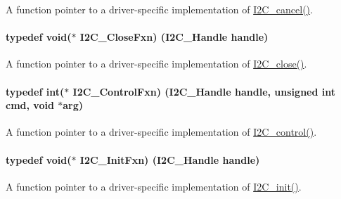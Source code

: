 A function pointer to a driver-\/specific implementation of \hyperlink{_i2_c_8h_a8cad0c04a9eca0fffc0ffe5586a5179b}{I2\+C\+\_\+cancel()}. 

\paragraph[{I2\+C\+\_\+\+Close\+Fxn}]{\setlength{\rightskip}{0pt plus 5cm}typedef void($\ast$ I2\+C\+\_\+\+Close\+Fxn) ({\bf I2\+C\+\_\+\+Handle} handle)}\label{_i2_c_8h_a083200108e980a0ef61e458f0b9fb9e7}


A function pointer to a driver-\/specific implementation of \hyperlink{_i2_c_8h_a12c86d89a687f2ee1eb980d99c32326d}{I2\+C\+\_\+close()}. 

\paragraph[{I2\+C\+\_\+\+Control\+Fxn}]{\setlength{\rightskip}{0pt plus 5cm}typedef int($\ast$ I2\+C\+\_\+\+Control\+Fxn) ({\bf I2\+C\+\_\+\+Handle} handle, unsigned int cmd, void $\ast$arg)}\label{_i2_c_8h_a4b15853f98d3d5e5135b8c52b8465fff}


A function pointer to a driver-\/specific implementation of \hyperlink{_i2_c_8h_a633003582213a5098467a4e647cc52f9}{I2\+C\+\_\+control()}. 

\paragraph[{I2\+C\+\_\+\+Init\+Fxn}]{\setlength{\rightskip}{0pt plus 5cm}typedef void($\ast$ I2\+C\+\_\+\+Init\+Fxn) ({\bf I2\+C\+\_\+\+Handle} handle)}\label{_i2_c_8h_adfb2451c8a1ce70402e43e4743c5fedf}


A function pointer to a driver-\/specific implementation of \hyperlink{_i2_c_8h_a9ff51ddf1d325776fef90cce0223772b}{I2\+C\+\_\+init()}. 


